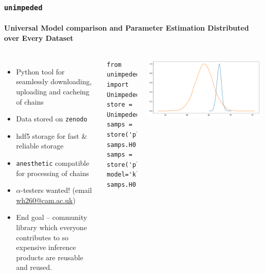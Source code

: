 \documentclass[aspectratio=169]{beamer}
\begin{document}
\begin{frame}[fragile]
    \frametitle{\texttt{unimpeded}}
    \framesubtitle{Universal Model comparison and Parameter Estimation Distributed over Every Dataset}
    \begin{columns}
    \begin{itemize}
        \item Python tool for seamlessly downloading, uploading and cacheing of chains
        \item Data stored on \texttt{zenodo} 
        \item hdf5 storage for fast \& reliable storage
        \item \texttt{anesthetic} compatible for processing of chains~
        \item $\alpha$-testers wanted! (email \href{mailto:wh260@cam.ac.uk}{wh260@cam.ac.uk}) 
        \item End goal -- community library which everyone contributes to so expensive inference products are reusable and reused.
    \end{itemize}


\lstset{language=Python}
\lstset{frame=lines}
\lstset{basicstyle=\footnotesize}
\begin{lstlisting}
from unimpeded import Unimpeded
store = Unimpeded(cache='data.hdf5')
samps = store('planck')
samps.H0.plot.kde_1d()
samps = store('planck', model='klcdm')
samps.H0.plot.kde_1d()
\end{lstlisting}
\includegraphics[width=\textwidth]{figures/unimpeded.pdf}

        
    \end{columns}
\end{frame}
 
\end{document}
